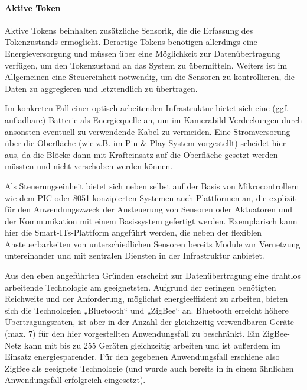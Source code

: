 
\paragraph{Aktive Token} %
\label{par:aktive_token}

Aktive Tokens beinhalten zusätzliche Sensorik, die die Erfassung des Tokenzustands ermöglicht. Derartige Tokens benötigen allerdings eine Energieversorgung und müssen über eine Möglichkeit zur Datenübertragung verfügen, um den Tokenzustand an das System zu übermitteln. Weiters ist im Allgemeinen eine Steuereinheit notwendig, um die Sensoren zu kontrollieren, die Daten zu aggregieren und letztendlich zu übertragen.

Im konkreten Fall einer optisch arbeitenden Infrastruktur bietet sich eine (ggf. aufladbare) Batterie als Energiequelle an, um im Kamerabild Verdeckungen durch ansonsten eventuell zu verwendende Kabel zu vermeiden. Eine Stromversorung über die Oberfläche (wie z.B. im Pin \& Play System \citep{Van-Laerhoven03} vorgestellt) scheidet hier aus, da die Blöcke dann mit Krafteinsatz auf die Oberfläche gesetzt werden müssten und nicht verschoben werden können. 

Als Steuerungseinheit bietet sich neben selbst auf der Basis von Mikrocontrollern wie dem PIC oder 8051 \citep{James97} konzipierten Systemen auch Plattformen an, die explizit für den Anwendungszweck der Ansteuerung von Sensoren oder Aktuatoren und der Kommunikation mit einem Basissystem gefertigt werden. Exemplarisch kann hier die Smart-ITs-Plattform \citep{Gellersen04} angeführt werden, die neben der flexiblen Ansteuerbarkeiten von unterschiedlichen Sensoren bereits Module zur Vernetzung untereinander und mit zentralen Diensten in der Infrastruktur anbietet.

Aus den eben angeführten Gründen erscheint zur Datenübertragung eine drahtlos arbeitende Technologie am geeignetsten. Aufgrund der geringen benötigten Reichweite und der Anforderung, möglichst energieeffizient zu arbeiten, bieten sich die Technologien „Bluetooth“ \citep{Bluetooth-SIG07} und „ZigBee“ \citep{ZigBee07} an. Bluetooth erreicht höhere Übertragungsraten, ist aber in der Anzahl der gleichzeitig verwendbaren Geräte (max. 7) für den hier vorgestellten Anwendungsfall zu beschränkt. Ein ZigBee-Netz kann mit bis zu 255 Geräten gleichzeitig arbeiten und ist außerdem im Einsatz energiesparender. Für den gegebenen Anwendungsfall erschiene also ZigBee als geeignete Technologie (und wurde auch bereits in \citep{Ferscha08} in einem ähnlichen Anwendungsfall erfolgreich eingesetzt).

